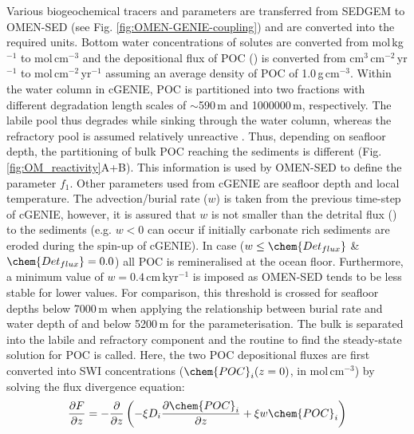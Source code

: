 \documentclass[gmd, manuscript]{copernicus}
\begin{document}
Various biogeochemical tracers and parameters are transferred from SEDGEM to OMEN-SED (see Fig. \ref{fig:OMEN-GENIE-coupling}) and are converted into the required units. 
Bottom water concentrations of solutes are converted from mol\,kg$^{-1}$ to mol\,cm$^{-3}$ and the depositional flux of POC () is converted from cm$^{3}$\,cm$^{-2}$\,yr$^{-1}$ 
to mol\,cm$^{-2}$\,yr$^{-1}$ assuming an average density of POC of 1.0\,g\,cm$^{-3}$. 
Within the water column in cGENIE, POC is partitioned into two fractions with different degradation length scales of  $\sim$590\,m and 1000000\,m, respectively. The labile pool thus degrades while sinking through the water column, 
whereas the refractory pool is assumed relatively unreactive \citep{ridgwell_marine_2007}. Thus, depending on seafloor depth, the partitioning of bulk POC reaching the sediments is different 
(Fig. \ref{fig:OM_reactivity}A+B). This information is used by OMEN-SED to define the parameter $f_1$. 
Other parameters used from cGENIE are seafloor depth and local temperature. 
The advection/burial rate ($w$) is taken from the previous time-step of cGENIE, however, it is assured that $w$ is not smaller than the detrital flux ()
to the sediments (e.g. $w<0$ can occur if initially carbonate rich sediments are eroded during the spin-up of cGENIE). In case ($w \leq \chem{Det_{flux}}$ \& $\chem{Det_{flux}} = 0.0$) all POC is remineralised 
at the ocean floor. Furthermore, a minimum value of $w=0.4$\,cm\,kyr$^{-1}$ is imposed as OMEN-SED tends to be less stable for lower values. %
For comparison, this threshold is crossed for seafloor depths below 7000\,m when applying the relationship between burial rate and water depth of \citet{middelburg_empirical_1997} and below 5200\,m for the \citet{burwicz_estimation_2011} 
parameterisation. The bulk  is separated into the labile and refractory component and the routine to find the steady-state solution for POC is called. 
Here, the two POC depositional fluxes are first converted into SWI concentrations ($\chem{POC}_i(z=0)$, in mol\,cm$^{-3}$) by solving the flux divergence equation: 
\begin{equation}
\frac{\partial F}{\partial z}=-\frac{\partial}{\partial z}\left( -\xi D_i \frac{\partial \chem{POC}_i}{\partial z} +\xi w \chem{POC}_i\right) \label{Eq_flux_divergence}
\end{equation}
\end{document}

